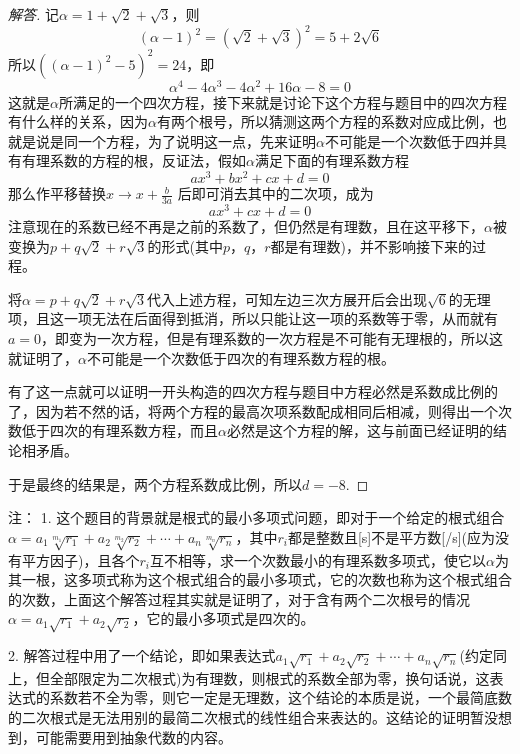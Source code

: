 \begin{proof}[解答]
记$\alpha=1+\sqrt{2}+\sqrt{3}$，则
\[ (\alpha-1)^2=(\sqrt{2}+\sqrt{3})^2=5+2\sqrt{6} \]
所以$((\alpha-1)^2-5)^2=24$，即
\[ \alpha^4-4\alpha^3-4\alpha^2+16\alpha-8=0 \]
这就是$\alpha$所满足的一个四次方程，接下来就是讨论下这个方程与题目中的四次方程有什么样的关系，因为$\alpha$有两个根号，所以猜测这两个方程的系数对应成比例，也就是说是同一个方程，为了说明这一点，先来证明$\alpha$不可能是一个次数低于四并具有有理系数的方程的根，反证法，假如$\alpha$满足下面的有理系数方程
\[ ax^3+bx^2+cx+d=0 \]
那么作平移替换$x \to x+\frac{b}{3a}$ 后即可消去其中的二次项，成为
\[ ax^3+cx+d=0 \]
注意现在的系数已经不再是之前的系数了，但仍然是有理数，且在这平移下，$\alpha$被变换为$p+q\sqrt{2}+r\sqrt{3}$的形式(其中$p$，$q$，$r$都是有理数)，并不影响接下来的过程。

将$\alpha=p+q\sqrt{2}+r\sqrt{3}$代入上述方程，可知左边三次方展开后会出现$\sqrt{6}$的无理项，且这一项无法在后面得到抵消，所以只能让这一项的系数等于零，从而就有$a=0$，即变为一次方程，但是有理系数的一次方程是不可能有无理根的，所以这就证明了，$\alpha$不可能是一个次数低于四次的有理系数方程的根。

有了这一点就可以证明一开头构造的四次方程与题目中方程必然是系数成比例的了，因为若不然的话，将两个方程的最高次项系数配成相同后相减，则得出一个次数低于四次的有理系数方程，而且$\alpha$必然是这个方程的解，这与前面已经证明的结论相矛盾。

于是最终的结果是，两个方程系数成比例，所以$d=-8$.
\end{proof}

注： 
1. 这个题目的背景就是根式的最小多项式问题，即对于一个给定的根式组合$\alpha=a_1\sqrt[m_1]{r_1}+a_2\sqrt[m_2]{r_2}+\cdots+a_n\sqrt[m_n]{r_n}$，其中$r_i$都是整数且[s]不是平方数[/s](应为没有平方因子)，且各个$r_i$互不相等，求一个次数最小的有理系数多项式，使它以$\alpha$为其一根，这多项式称为这个根式组合的最小多项式，它的次数也称为这个根式组合的次数，上面这个解答过程其实就是证明了，对于含有两个二次根号的情况$\alpha=a_1\sqrt{r_1}+a_2\sqrt{r_2}$，它的最小多项式是四次的。

2. 解答过程中用了一个结论，即如果表达式$a_1\sqrt{r_1}+a_2\sqrt{r_2}+\cdots+a_n\sqrt{r_n}$(约定同上，但全部限定为二次根式)为有理数，则根式的系数全部为零，换句话说，这表达式的系数若不全为零，则它一定是无理数，这个结论的本质是说，一个最简底数的二次根式是无法用别的最简二次根式的线性组合来表达的。这结论的证明暂没想到，可能需要用到抽象代数的内容。





